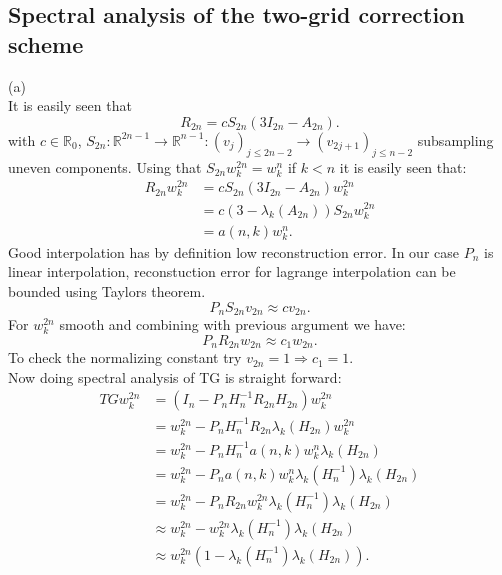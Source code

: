 \documentclass[a4paper,12pt]{article}
\begin{document}
\subsection{Spectral analysis of the two-grid correction scheme}
(a) \\
It is easily seen that
\begin{equation}
    R_{2n} =  c S_{2n} (3I_{2n} -A_{2n}).
\end{equation}
with $c \in \mathbb{R}_{0}$, $S_{2n}: \mathbb{R}^{2n-1} \rightarrow \mathbb{R}^{n-1}: (v_{j})_{j \leq 2n-2}
    \rightarrow (v_{2j+1})_{j \leq n-2}$  subsampling uneven components.
Using that $S_{2n}w_{k}^{2n} = w_{k}^{n}$ if $k<n$ it is easily seen that:
\begin{align}
    R_{2n} w_{k}^{2n} & = cS_{2n}(3I_{2n}- A_{2n}) w_{k}^{2n}         \\
                      & = c(3- \lambda_{k}(A_{2n})) S_{2n} w_{k}^{2n} \\
                      & = a(n,k) w_{k}^{n} .
\end{align}
Good interpolation has by definition low reconstruction error.
In our case $P_{n}$ is linear interpolation, reconstuction error for lagrange interpolation can be bounded
using Taylors theorem.
\begin{equation}
    P_{n} S_{2n} v_{2n}  \approx c v_{2n}.
\end{equation}
For $w_{k}^{2n}$ smooth and combining with previous argument we have:
\begin{equation}
    P_{n} R_{2n} w_{2n}  \approx c_{1} w_{2n}.
\end{equation}
To check the normalizing constant try $v_{2n} = 1 \Rightarrow c_{1} =1$. \\
Now doing spectral analysis of TG is straight forward:
\begin{align}
    TG w_{k}^{2n} & = (I_{n} - P_{n} H_{n}^{-1} R_{2n} H_{2n}) w_{k}^{2n}                                 \\
                  & =  w_{k}^{2n} - P_{n} H_{n}^{-1} R_{2n} \lambda_{k}(H_{2n}) w_{k}^{2n}                \\
                  & =  w_{k}^{2n} - P_{n} H_{n}^{-1}  a(n,k) w_{k}^{n} \lambda_{k}(H_{2n})                \\
                  & =  w_{k}^{2n} - P_{n}  a(n,k) w_{k}^{n} \lambda_{k}(H_{n}^{-1})  \lambda_{k}(H_{2n})  \\
                  & =  w_{k}^{2n} - P_{n}  R_{2n} w_{k}^{2n} \lambda_{k}(H_{n}^{-1})  \lambda_{k}(H_{2n}) \\
                  & \approx  w_{k}^{2n} -  w_{k}^{2n} \lambda_{k}(H_{n}^{-1})  \lambda_{k}(H_{2n})        \\
                  & \approx  w_{k}^{2n} (1-   \lambda_{k}(H_{n}^{-1})  \lambda_{k}(H_{2n})).
\end{align}
\end{document}
